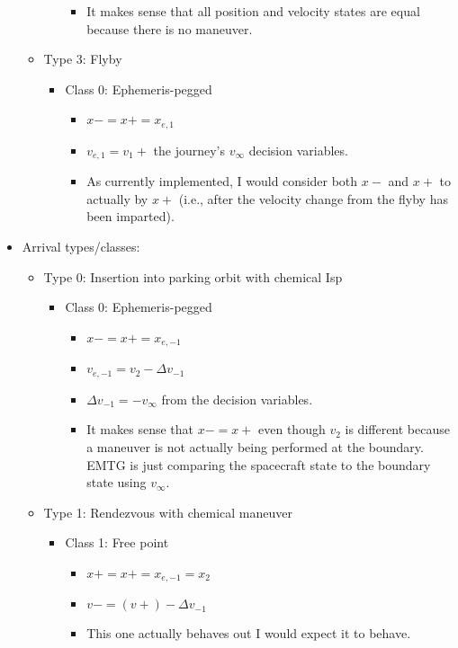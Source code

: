 \documentclass[11pt]{article}
\begin{document}
\begin{itemize}
\begin{itemize}
\begin{itemize}
\begin{itemize}
				\item It makes sense that all position and velocity states are equal because there is no maneuver.
			\end{itemize}
		\end{itemize}
		\item Type 3: Flyby
		\begin{itemize}
			\item Class 0: Ephemeris-pegged
			\begin{itemize}
				\item $x- = x+ = x_{e,1}$
				\item $v_{e,1} = v_1 + $ the journey's $v_\infty$ decision variables.
				\item As currently implemented, I would consider both $x-$ and $x+$ to actually by $x+$ (i.e., after the velocity change from the flyby has been imparted).
			\end{itemize}
		\end{itemize}
	\end{itemize}
	\item Arrival types/classes:
	\begin{itemize}
		\item Type 0: Insertion into parking orbit with chemical Isp
		\begin{itemize}
			\item Class 0: Ephemeris-pegged
			\begin{itemize}
				\item $x- = x+ = x_{e,-1}$
				\item $v_{e,-1} = v_2 - \Delta v_{-1}$
				\item $\Delta v_{-1} =-v_\infty$ from the decision variables.
				\item It makes sense that $x- = x+$ even though $v_2$ is different because a maneuver is not actually being performed at the boundary. EMTG is just comparing the spacecraft state to the boundary state using $v_\infty$.
			\end{itemize}
		\end{itemize}
		\item Type 1: Rendezvous with chemical maneuver
		\begin{itemize}
			\item Class 1: Free point
			\begin{itemize}
				\item $x+ = x+ = x_{e,-1} = x_2$
				\item $v- = (v+) - \Delta v_{-1}$
				\item This one actually behaves out I would expect it to behave.

\end{itemize}
\end{itemize}
\end{itemize}
\end{itemize}
\end{document}
